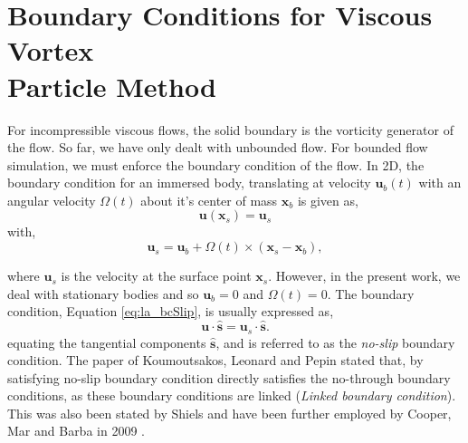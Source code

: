 
\section{Boundary Conditions for Viscous Vortex \\Particle Method}
\label{sec:boundaryConditions}

For incompressible viscous flows, the solid boundary is the vorticity generator of the flow. So far, we have only dealt with unbounded flow. For bounded flow simulation, we must enforce the boundary condition of the flow. In 2D, the boundary condition for an immersed body, translating at velocity $\mathbf{u}_b(t)$ with an angular velocity $\Omega(t)$ about it's center of mass $\mathbf{x}_b$ is given as,
\begin{equation}
\mathbf{u}(\mathbf{x}_s) = \mathbf{u}_s
\label{eq:la_bcSlip}
\end{equation}
with,
\begin{equation}
\mathbf{u}_s = \mathbf{u}_b + \Omega(t) \times (\mathbf{x}_s - \mathbf{x}_b),
\end{equation}

where $\mathbf{u}_s$ is the velocity at the surface point $\mathbf{x}_s$. However, in the present work, we deal with stationary bodies and so $\mathbf{u}_b = 0$ and $\Omega(t) = 0$. The boundary condition, Equation \ref{eq:la_bcSlip}, is usually expressed as,
\begin{equation}
\mathbf{u} \cdot \hat{\mathbf{s}} =  \mathbf{u}_s \cdot \hat{\mathbf{s}}.
\end{equation}
equating the tangential components $\hat{\mathbf{s}}$, and is referred to as the \emph{no-slip} boundary condition. The paper of Koumoutsakos, Leonard and Pepin \cite{Koumoutsakos1994b} stated that, by satisfying no-slip boundary condition directly satisfies the no-through boundary conditions, as these boundary conditions are linked (\emph{Linked boundary condition}). This was also been stated by Shiels \cite{Shiels1998} and have been further employed by Cooper, Mar and Barba in 2009 \cite{Cooper2009a}.

